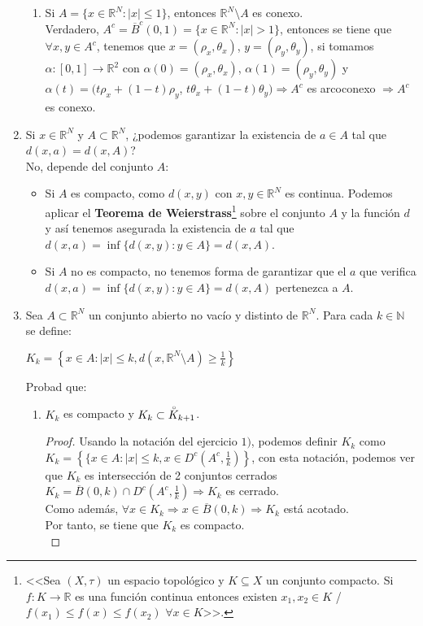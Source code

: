 \documentclass[a4paper, 11pt]{article} %
\begin{document}
\begin{enumerate}
\begin{enumerate}[label=\alph*)]
		\item Si $A=\{x \in \mathbb{R}^N: |x| \le 1\}$, entonces $\mathbb{R}^N \setminus A$ es conexo.\\
		Verdadero, $A^c = \overline{B}^c(0,1) = \{x \in \mathbb{R}^N: |x| > 1\}$, entonces se tiene que $\forall x,y \in A^c$, tenemos que $x=(\rho_x, \theta_x)$, $y=(\rho_y, \theta_y)$, si tomamos $\alpha: [0,1] \rightarrow \mathbb{R}^2$ con $\alpha(0)=(\rho_x, \theta_x)$, $\alpha(1)=(\rho_y, \theta_y)$ y $\alpha(t)=(t\rho_x + (1-t)\rho_y$, $t\theta_x + (1-t)\theta_y) \Rightarrow A^c$ es arcoconexo $\Rightarrow A^c$ es conexo.
	\end{enumerate}
	\item Si $x \in \mathbb{R}^N$ y $A \subset \mathbb{R}^N$, ¿podemos garantizar la existencia de $a \in A$ tal que $d(x,a)=d(x,A)$?\\
	No, depende del conjunto $A$:
	\begin{itemize}
		\item Si $A$ es compacto, como $d(x,y)$ con $x,y \in \mathbb{R}^N$ es continua. Podemos aplicar el \textbf{Teorema de Weierstrass}\footnote{<<Sea $(X,\tau)$ un espacio topológico y $K \subseteq X$ un conjunto compacto. Si $f: K\rightarrow \mathbb{R}$ es una función continua entonces existen $x_1,x_2 \in K$  /  $f(x_1) \leq f(x) \leq f(x_2)$ $\forall x \in K$>>.} sobre el conjunto $A$ y la función $d$ y así tenemos asegurada la existencia de $a$ tal que $d(x,a) = \inf\{d(x,y): y\in A \} = d(x,A)$.
		\item Si $A$ no es compacto, no tenemos forma de garantizar que el $a$ que verifica $d(x,a) = \inf\{d(x,y): y\in A \} = d(x,A)$ pertenezca a $A$.
	\end{itemize}
	\item Sea $A \subset \mathbb{R}^N$ un conjunto abierto no vacío y distinto de $\mathbb{R}^N$. Para cada $k \in \mathbb{N}$ se define:
	\begin{center}
		$K_k = \left\{ x \in A: |x| \le k, d(x,\mathbb{R}^N \setminus A) \ge \frac{1}{k}\right\}$
	\end{center}
	Probad que:
	\begin{enumerate}[label=\alph*)]
		\item $K_k$ es compacto y $K_k \subset \accentset{\circ}K_{k+1}$.
		\begin{proof}
			Usando la notación del ejercicio $1)$, podemos definir $K_k$ como $K_k = \left\{\{x \in A: |x| \le k, x \in D^c\left(A^c, \frac{1}{k}\right)\right\}$, con esta notación, podemos ver que $K_k$ es intersección de 2 conjuntos cerrados $K_k = \overline{B}(0,k) \cap D^c\left(A^c,\frac{1}{k}\right) \Rightarrow K_k$ es cerrado.\\
			Como además, $\forall x \in K_k \Rightarrow x \in \overline{B}(0,k) \Rightarrow K_k$ está acotado.\\
			Por tanto, se tiene que $K_k$ es compacto.\\
			

\end{proof}
\end{enumerate}
\end{enumerate}
\end{document}
